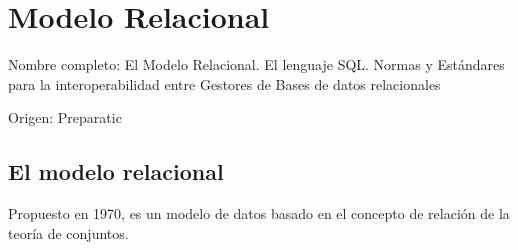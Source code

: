 \setcounter{section}{63} %
\section{Modelo Relacional}

Nombre completo: El Modelo Relacional. El lenguaje SQL. Normas y Estándares para la interoperabilidad entre Gestores de Bases de datos relacionales

Origen: Preparatic

\localtableofcontents

\subsection{El modelo relacional}

Propuesto en 1970, es un modelo de datos basado en el concepto de relación de la teoría de conjuntos.
